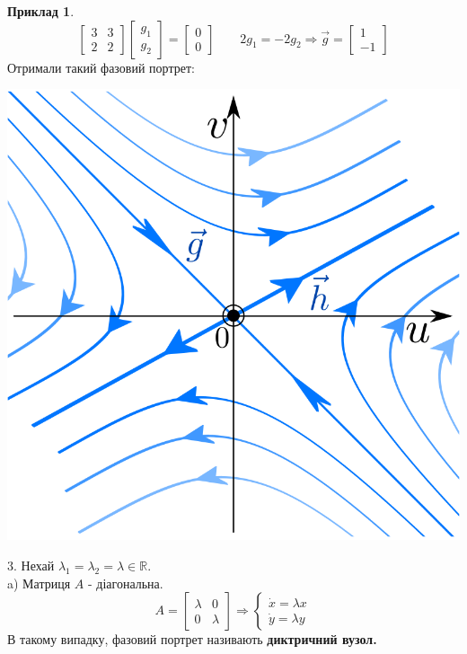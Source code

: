\documentclass[14pt,a4paper]{scrartcl}
\theoremstyle{definition}
\newtheorem*{example}{Приклад}
\theoremstyle{definition}
\theoremstyle{definition}
\begin{document}
\begin{example}
    $$
    \begin{bmatrix}
     3 &3 \\
     2 & 2
    \end{bmatrix} \begin{bmatrix}
     g_1 \\
     g_2
    \end{bmatrix} = \begin{bmatrix}
     0 \\
     0
    \end{bmatrix} \qquad 2 g_1 =-2 g_2 \Rightarrow \overrightarrow{g} = \begin{bmatrix}
     1 \\
     -1
    \end{bmatrix}
    $$
    Отримали такий фазовий портрет:
    \begin{center} \includegraphics[scale=0.3]{assets/lectures_recent-c4b9c37b.png} \end{center}
\end{example}


3. Нехай $ \lambda_1 = \lambda_2 = \lambda \in \mathbb{R}$.\\
a) Матриця $A$ - діагональна.
$$
  A = \begin{bmatrix}
     \lambda & 0 \\
     0 & \lambda
    \end{bmatrix} \Longrightarrow \begin{cases}
        \dot{x} = \lambda x\\
        \dot{y} = \lambda y
    \end{cases}
$$
В такому випадку, фазовий портрет називають \textbf{диктричний вузол.}
\end{document}
